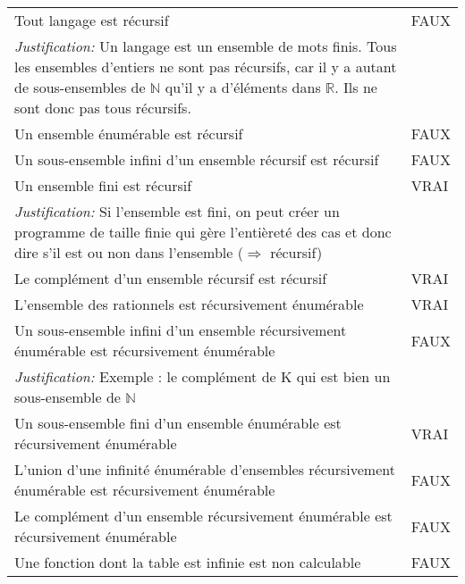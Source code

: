 \begin{tabular}{p{13cm}|l}
    Tout langage est récursif & FAUX \\
    \textit{Justification:} Un langage est un ensemble de mots finis. Tous les ensembles d'entiers ne sont pas récursifs, car il y a autant de sous-ensembles de $\mathbb{N}$ qu'il y a d'éléments dans $\mathbb{R}$. Ils ne sont donc pas tous récursifs. & \\
    \hline
    Un ensemble énumérable est récursif & FAUX \\
    \hline
    Un sous-ensemble infini d'un ensemble récursif est récursif & FAUX \\
    \hline
    Un ensemble fini est récursif & VRAI \\
    \textit{Justification:} Si l'ensemble est fini, on peut créer un programme de taille finie qui gère l'entièreté des cas et donc dire s'il est ou non dans l'ensemble ($\Rightarrow$ récursif) & \\
    \hline
    Le complément d'un ensemble récursif est récursif & VRAI \\
    \hline
    L'ensemble des rationnels est récursivement énumérable & VRAI \\
    \hline
    Un sous-ensemble infini d'un ensemble récursivement énumérable est récursivement énumérable & FAUX \\
    \textit{Justification:} Exemple : le complément de K qui est bien un sous-ensemble de $\mathbb{N}$ & \\
    \hline
    Un sous-ensemble fini d'un ensemble énumérable est récursivement énumérable & VRAI \\
    \hline
    L'union d'une infinité énumérable d'ensembles récursivement énumérable est récursivement énumérable & FAUX \\
    \hline
    Le complément d'un ensemble récursivement énumérable est récursivement énumérable & FAUX \\
    \hline
    Une fonction dont la table est infinie est non calculable & FAUX \\

\end{tabular}
